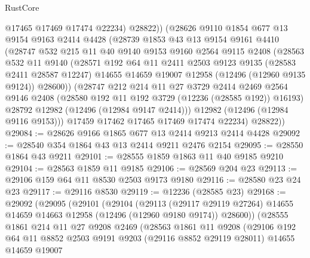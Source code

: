 \begin{lexlean}{RustCore}
\begin{coremodule}
            @17465
            @17469
            @17474
            @22234)
          @28822))
      (@28626
        @9110
        @1854
        @677
        @13
        @9154
        @9163
        @2414
        @4428
        (@28739
          @1853
          @43
          @13
          @9154
          @9161
          @4410
          (@28747
            @532
            @215
            @11
            @40
            @9140
            @9153
            @9160
            @2564
            @9115
            @2408
            (@28563
              @532
              @11
              @9140
              (@28571
                @192
                @64
                @11
                @2411
                @2503
                @9123
                @9135
                (@28583 @2411 @28587 @12247)
                @14655
                @14659
                @19007
                @12958
                (@12496 (@12960 @9135 @9124))
                @28600))
            (@28747
              @212
              @214
              @11
              @27
              @3729
              @2414
              @2469
              @2564
              @9146
              @2408
              (@28580 @192 @11 @192 @3729 (@12236 (@28585 @192)) @16193)
              @28792
              @12982
              (@12496 (@12984 @9147 @2414)))
            @12982
            (@12496 (@12984 @9116 @9153)))
          @17459
          @17462
          @17465
          @17469
          @17474
          @22234)
        @28822))
@29084 := @28626 @9166 @1865 @677 @13 @2414 @9213 @2414 @4428
@29092 := @28540 @354 @1864 @43 @13 @2414 @9211 @2476 @2154
@29095 := @28550 @1864 @43 @9211
@29101 := @28555 @1859 @1863 @11 @40 @9185 @9210
@29104 := @28563 @1859 @11 @9185
@29106 := @28569 @204 @23
@29113 := @29106 @159 @64 @11 @8530 @2503 @9173 @9180
@29116 := @28580 @23 @24 @23
@29117 := @29116 @8530
@29119 := @12236 (@28585 @23)
@29168 := @29092
    (@29095
      (@29101
        (@29104
          (@29113
            (@29117 @29119 @27264)
            @14655
            @14659
            @14663
            @12958
            (@12496 (@12960 @9180 @9174))
            @28600))
        (@28555
          @1861
          @214
          @11
          @27
          @9208
          @2469
          (@28563
            @1861
            @11
            @9208
            (@29106
              @192
              @64
              @11
              @8852
              @2503
              @9191
              @9203
              (@29116 @8852 @29119 @28011)
              @14655
              @14659
              @19007

\end{coremodule}
\end{lexlean}
